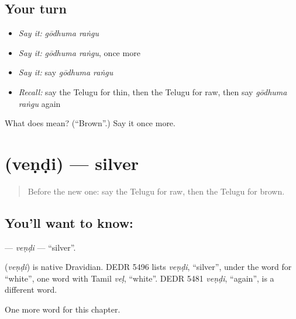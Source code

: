 \subsection*{Your turn}
\begin{itemize}
\raggedright
  \item \emph{Say it:} \emph{gōdhuma raṅgu}
  \item \emph{Say it:} \emph{gōdhuma raṅgu}, once more
  \item \emph{Say it:} say \emph{gōdhuma raṅgu}
  \item \emph{Recall:} say the Telugu for thin, then the Telugu for raw, then say \emph{gōdhuma raṅgu} again
\end{itemize}

\begin{tcolorbox}[breakable,colback=teal!4,colframe=teal!35!black,title={Before you move on}]
What does   mean? (\textquotedblleft{}Brown\textquotedblright{}.) Say it once more.
\end{tcolorbox}
\section[\texorpdfstring{\te{వెండి} (veṇḍi)}{వెండి (veṇḍi)}]{ (veṇḍi) — silver}

\label{lesson:TE-C221-vendi}



\begin{quote}
Before the new one: say the Telugu for raw, then the Telugu for brown.
\end{quote}

\subsection*{You'll want to know: }
\textbf{} — \emph{veṇḍi} — \textquotedblleft{}silver\textquotedblright{}.

\begin{cousinweb}
\textbf{} (\emph{veṇḍi}) is native Dravidian. DEDR 5496 lists \emph{veṇḍi}, \textquotedblleft{}silver\textquotedblright{}, under the word for \textquotedblleft{}white\textquotedblright{}, one word with Tamil \emph{veḷ}, \textquotedblleft{}white\textquotedblright{}. DEDR 5481 \emph{veṇḍi}, \textquotedblleft{}again\textquotedblright{}, is a different word.
\end{cousinweb}

\begin{grammarlens}[title={What you've built}]
One more word for this chapter.
\end{grammarlens}

